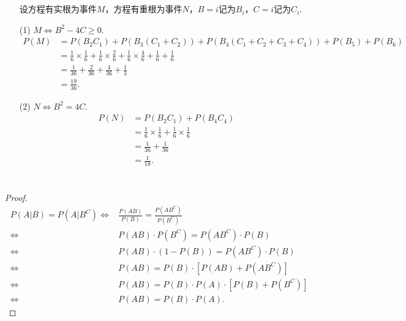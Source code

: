 \documentclass{article}
\begin{document}
\section{}  %
\begin{enumerate}
    \item []设方程有实根为事件$M$，方程有重根为事件$N$，$B=i$记为$B_i$，$C=i$记为$C_i$.
    \item [(1)]$M\Leftrightarrow B^2-4C\geq 0$.
    \begin{align*}
        P(M)
        & = 
        P(B_2 C_1) + P(B_3 (C_1+C_2)) + P(B_4 (C_1 + C_2 + C_3 + C_4))+P(B_5)+P(B_6)\\
        & =
        \frac{1}{6}\times \frac{1}{6} + \frac{1}{6}\times \frac{2}{6} +
        \frac{1}{6}\times \frac{4}{6} + \frac{1}{6} + \frac{1}{6} \\
        & =
        \frac{1}{36} + \frac{2}{36} + \frac{4}{36} + \frac{1}{3}\\
        & =
        \frac{19}{36}.
    \end{align*}
    \item [(2)]$N\Leftrightarrow B^2 = 4C$.
    \begin{align*}
        P(N)
        & =
        P(B_2 C_1) + P(B_4 C_4)\\
        & =
        \frac{1}{6}\times\frac{1}{6} + \frac{1}{6}\times \frac{1}{6}\\
        & =
        \frac{1}{36} + \frac{1}{36}\\
        & =
        \frac{1}{18}.
    \end{align*}
\end{enumerate}

\section{}  %
\begin{proof}
    \begin{align*}
        P(A|B)=P(A|B^{C})
        \Leftrightarrow &
        \frac{P(AB)}{P(B)} = \frac{P(AB^C)}{P(B^{C})}\\
        \Leftrightarrow &
        P(AB)\cdot P(B^{C}) = P(AB^{C})\cdot P(B)\\
        \Leftrightarrow &
        P(AB)\cdot (1-P(B)) = P(AB^{C})\cdot P(B)\\
        \Leftrightarrow &
        P(AB) = P(B)\cdot \left[P(AB)+P(AB^{C})\right]\\
        \Leftrightarrow &
        P(AB) = P(B)\cdot P(A)\cdot \left[P(B)+P(B^{C})\right]\\
        \Leftrightarrow &
        P(AB) = P(B)\cdot P(A).
    \end{align*}
\end{proof}
\end{document}
